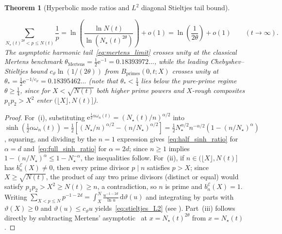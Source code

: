 \documentclass[11pt,reqno]{amsart}
\theoremstyle{plain}
\newtheorem{theorem}{Theorem}[section]
\theoremstyle{definition}
\theoremstyle{remark}
\numberwithin{equation}{section}
\newcommand{\dd}{\,\mathrm{d}}
\newcommand{\ee}{\mathrm{e}}
\begin{document}
\begin{theorem}[Hyperbolic mode ratios and $L^2$ diagonal Stieltjes tail bound]
\begin{enumerate}[label=\textup{(\roman*)},leftmargin=2.2em]
\begin{equation}\label{eq:mertens_limit}
\sum_{N_\star(t)^{2\theta} < p \le N(t)} \frac{1}{p} = \ln\!\left(\frac{\ln N(t)}{\ln(N_\star(t)^{2\theta})}\right) + o(1) = \ln\!\left(\frac{1}{2\theta}\right) + o(1) \qquad (t \to \infty).
\end{equation}
The asymptotic harmonic tail~\eqref{eq:mertens_limit} crosses unity at the classical Mertens benchmark $\theta_{\mathrm{Mertens}} = \frac{1}{2}\ee^{-1} = 0.18393972\dots$, while the leading Chebyshev--Stieltjes bound $c_\vartheta\ln(1/(2\theta))$ from $B_{\mathrm{primes}}(0,t;X)$ crosses unity at $\theta_* = \frac{1}{2}\ee^{-1/c_\vartheta} = 0.18395462\dots$ (note that $\theta_* < \frac{1}{4}$ lies below the pure-prime regime $\theta \ge \frac{1}{4}$, since for $X < \sqrt{N(t)}$ both higher prime powers and $X$-rough composites $p_1 p_2 > X^2$ enter $(\lfloor X\rfloor, N(t)]$).
\end{enumerate}
\end{theorem}

\begin{proof}
For~(i), substituting $\ee^{\frac{1}{2}\alpha\omega_n(t)} = (N_\star(t)/n)^{\alpha/2}$ into $\sinh(\frac{1}{2}\alpha\omega_n(t)) = \frac{1}{2}[(N_\star/n)^{\alpha/2} - (n/N_\star)^{\alpha/2}] = \frac{1}{2}N_\star^{\alpha/2}n^{-\alpha/2}(1 - (n/N_\star)^\alpha)$, squaring, and dividing by the $n = 1$ expression gives~\eqref{eq:half_sinh_ratio} for $\alpha = d$ and~\eqref{eq:full_sinh_ratio} for $\alpha = 2d$; since $n \ge 1$ implies $1 - (n/N_\star)^\alpha \le 1 - N_\star^{-\alpha}$, the inequalities follow. For~(ii), if $n \in (\lfloor X\rfloor, N(t)]$ has $b_n^{\mathcal{E}}(X) \neq 0$, then every prime divisor $p \mid n$ satisfies $p > X$; since $X \ge \sqrt{N(t)}$, the product of any two prime divisors (distinct or equal) would satisfy $p_1 p_2 > X^2 \ge N(t) \ge n$, a contradiction, so $n$ is prime and $b_n^{\mathcal{E}}(X) = 1$. Writing $\sum_{X < p \le N} p^{-1-2d} = \int_X^N \frac{u^{-1-2d}}{\ln u}\dd\vartheta(u)$ and integrating by parts with $\vartheta(X) \ge 0$ and $\vartheta(u) \le c_\vartheta u$ yields~\eqref{eq:stieltjes_L2} (see ). Part~(iii) follows directly by subtracting Mertens' asymptotic~\cite{mertens1874} at $x = N_\star(t)^{2\theta}$ from $x = N_\star(t)$.
\end{proof}
\end{document}
